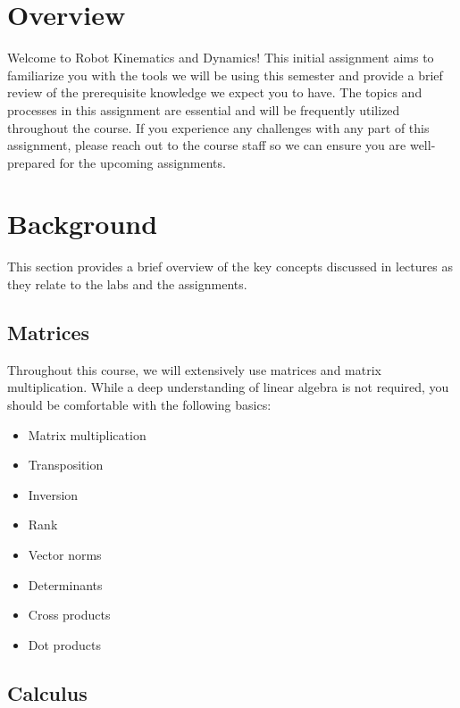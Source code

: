 \documentclass{16384_doc}
\begin{document}
\maketitle

\tableofcontents

\section{Overview}
Welcome to Robot Kinematics and Dynamics! This initial assignment aims to familiarize you with the tools we will be using this semester and provide a brief review of the prerequisite knowledge we expect you to have. The topics and processes in this assignment are essential and will be frequently utilized throughout the course. If you experience any challenges with any part of this assignment, please reach out to the course staff so we can ensure you are well-prepared for the upcoming assignments.

\section{Background}

This section provides a brief overview of the key concepts discussed in lectures as they relate to the labs and the assignments.

\subsection{Matrices}

Throughout this course, we will extensively use matrices and matrix multiplication. While a deep understanding of linear algebra is not required, you should be comfortable with the following basics:

\begin{itemize}
    \item Matrix multiplication
    \item Transposition
    \item Inversion
    \item Rank
    \item Vector norms
    \item Determinants
    \item Cross products
    \item Dot products
\end{itemize}

\subsection{Calculus}
\end{document}
